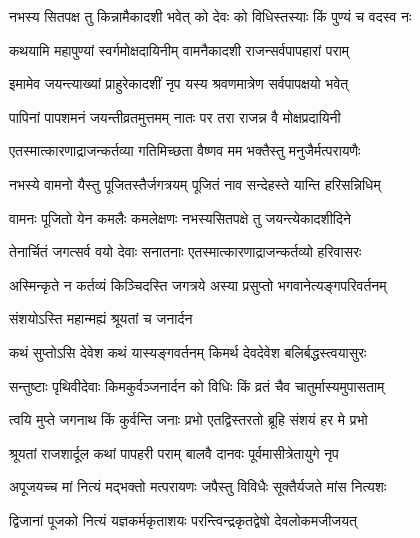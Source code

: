 
\twolineshloka
{नभस्य सितपक्ष तु किन्नामैकादशी भवेत्}
{को देवः को विधिस्तस्याः किं पुण्यं च वदस्व नः} %


\twolineshloka
{कथयामि महापुण्यां स्वर्गमोक्षदायिनीम्}
{वामनैकादशी राजन्सर्वपापहारां पराम्} %

\twolineshloka
{इमामेव जयन्त्याख्यां प्राहुरेकादशीं नृप}
{यस्य श्रवणमात्रेण सर्वपापक्षयो भवेत्} %

\twolineshloka
{पापिनां पापशमनं जयन्तीव्रतमुत्तमम्}
{नातः पर तरा राजन्न वै मोक्षप्रदायिनी} %

\twolineshloka
{एतस्मात्कारणाद्राजन्कर्तव्या गतिमिच्छता}
{वैष्णव मम भक्तैस्तु मनुजैर्मत्परायणैः} %

\twolineshloka
{नभस्ये वामनो यैस्तु पूजितस्तैर्जगत्रयम्}
{पूजितं नाव सन्देहस्ते यान्ति हरिसन्निधिम्} %

\twolineshloka
{वामनः पूजितो येन कमलैः कमलेक्षणः}
{नभस्यसितपक्षे तु जयन्त्येकादशीदिने} %

\twolineshloka
{तेनार्चितं जगत्सर्व वयो देवाः सनातनाः}
{एतस्मात्कारणाद्राजन्कर्तव्यो हरिवासरः} %

\twolineshloka
{अस्मिन्कृते न कर्तव्यं किञ्चिदस्ति जगत्रये}
{अस्या प्रसुप्तो भगवानेत्यङ्गपरिवर्तनम्} %



\onelineshloka
{संशयोऽस्ति महान्मह्यं श्रूयतां च जनार्दन} %

\twolineshloka
{कथं सुप्तोऽसि देवेश कथं यास्यङ्गवर्तनम्}
{किमर्थ देवदेवेश बलिर्बद्धस्त्वयासुरः} %

\twolineshloka
{सन्तुष्टाः पृथिवीदेवाः किमकुर्वञ्जनार्दन}
{को विधिः किं व्रतं चैव चातुर्मास्यमुपासताम्} %

\twolineshloka
{त्वयि मुप्ते जगनाथ किं कुर्वन्ति जनाः प्रभो}
{एतद्विस्तरतो ब्रूहि संशयं हर मे प्रभो} %


\twolineshloka
{श्रूयतां राजशार्दूल कथां पापहरी पराम्}
{बालवै दानवः पूर्वमासीत्रेतायुगे नृप} %

\twolineshloka
{अपूजयच्च मां नित्यं मद्भक्तो मत्परायणः}
{जपैस्तु विविधैः सूक्तैर्यजते मांस नित्यशः} %

\twolineshloka
{द्विजानां पूजको नित्यं यज्ञकर्मकृताशयः}
{परन्त्विन्द्रकृतद्वेषो देवलोकमजीजयत्} %

